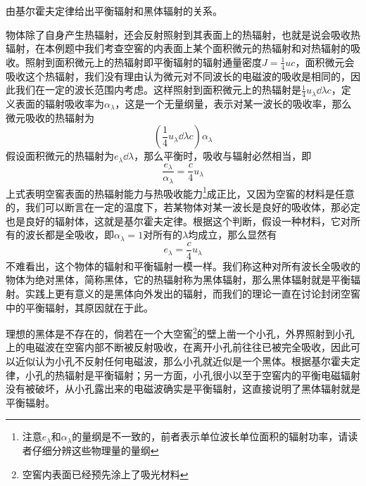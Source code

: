 \documentclass[../../main.tex]{subfiles}
\begin{document}
\begin{example}
    由基尔霍夫定律给出平衡辐射和黑体辐射的关系。
    \begin{solution}
        物体除了自身产生热辐射，还会反射照射到其表面上的热辐射，也就是说会吸收热辐射，在本例题中我们考查空窖的内表面上某个面积微元的热辐射和对热辐射的吸收。照射到面积微元上的热辐射即平衡辐射的辐射通量密度\(J=\frac{1}{4}uc\)，面积微元会吸收这个热辐射，我们没有理由认为微元对不同波长的电磁波的吸收是相同的，因此我们在一定的波长范围内考虑。这样照射到面积微元上的热辐射是\(\frac{1}{4}u_{\lambda}\dd\lambda c\)，定义表面的辐射吸收率为\(\alpha_{\lambda}\)，这是一个无量纲量，表示对某一波长的吸收率，那么微元吸收的热辐射为
        \begin{equation}
            \left(\frac{1}{4}u_{\lambda}\dd\lambda c\right)\alpha_{\lambda}
        \end{equation}
        假设面积微元的热辐射为\(e_{\lambda}\dd\lambda\)，那么平衡时，吸收与辐射必然相当，即
        \begin{equation}
            \frac{e_{\lambda}}{\alpha_{\lambda}}=\frac{c}{4}u_{\lambda}
        \end{equation}
        上式表明空窖表面的热辐射能力与热吸收能力\footnote{注意\(e_{\lambda}\)和\(\alpha_{\lambda}\)的量纲是不一致的，前者表示单位波长单位面积的辐射功率，请读者仔细分辨这些物理量的量纲}成正比，又因为空窖的材料是任意的，我们可以断言在一定的温度下，若某物体对某一波长是良好的吸收体，那必定也是良好的辐射体，这就是基尔霍夫定律。根据这个判断，假设一种材料，它对所有的波长都是全吸收，即\(\alpha_{\lambda}=1\)对所有的\(\lambda\)均成立，那么显然有
        \begin{equation}
            e_{\lambda}=\frac{c}{4}u_{\lambda}
        \end{equation}
        不难看出，这个物体的辐射和平衡辐射一模一样。我们称这种对所有波长全吸收的物体为绝对黑体，简称黑体，它的热辐射称为黑体辐射，那么黑体辐射就是平衡辐射。实践上更有意义的是黑体向外发出的辐射，而我们的理论一直在讨论封闭空窖中的平衡辐射，其原因就在于此。

        理想的黑体是不存在的，倘若在一个大空窖\footnote{空窖内表面已经预先涂上了吸光材料}的壁上凿一个小孔，外界照射到小孔上的电磁波在空窖内部不断被反射吸收，在离开小孔前往往已被完全吸收，因此可以近似认为小孔不反射任何电磁波，那么小孔就近似是一个黑体。根据基尔霍夫定律，小孔的热辐射是平衡辐射；另一方面，小孔很小以至于空窖内的平衡电磁辐射没有被破坏，从小孔露出来的电磁波确实是平衡辐射，这直接说明了黑体辐射就是平衡辐射。
    \end{solution}
\end{example}
\end{document}
